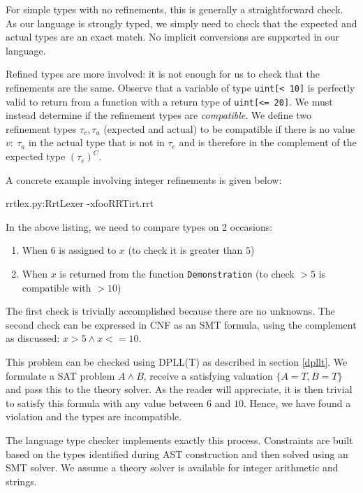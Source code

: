 \documentclass[a4paper,openany,12pt]{book}
\begin{document}
For simple types with no refinements, this is generally a straightforward check.
As our language is strongly typed, we simply need to check that the expected and actual types are an exact match.
No implicit conversions are supported in our language.

Refined types are more involved: it is not enough for us to check that the refinements are the same.
Observe that a variable of type \texttt{uint[< 10]} is perfectly valid to return from a function with a return type of
\texttt{uint[<= 20]}.
We must instead determine if the refinement types are \emph{compatible}.
We define two refinement types $\tau_e, \tau_a$ (expected and actual) to be compatible if there is no value $v:~\tau_a$
in the actual type that is not in $\tau_e$ and is therefore in the complement of the expected type $(\tau_e)^C$.

A concrete example involving integer refinements is given below:

\begin{mycodefile}{rrtlex.py:RrtLexer -x}{foo}{RRT}{irt.rrt}\end{mycodefile}

In the above listing, we need to compare types on 2 occasions:

\begin{enumerate}
    \item When $6$ is assigned to $x$ (to check it is greater than $5$)
    \item When $x$ is returned from the function \texttt{Demonstration} (to check $> 5$ is compatible with $> 10$)
\end{enumerate}

The first check is trivially accomplished because there are no unknowns.
The second check can be expressed in CNF as an SMT formula, using the complement as discussed: $x > 5 \land x <= 10$.

This problem can be checked using DPLL(T) as described in section \ref{dpllt}.
We formulate a SAT problem $A \land B$, receive a satisfying valuation $\{A=T, B=T\}$ and pass this to the theory
solver.
As the reader will appreciate, it is then trivial to satisfy this formula with any value between $6$ and $10$.
Hence, we have found a violation and the types are incompatible.

The language type checker implements exactly this process.
Constraints are built based on the types identified during AST construction and then solved using an SMT solver.
We assume a theory solver is available for integer arithmetic and strings.
\end{document}
